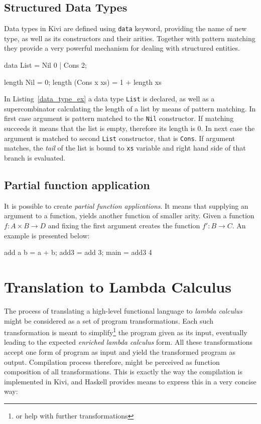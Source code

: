 \documentclass[12pt,a4paper]{report}
\begin{document}
\subsection{Structured Data Types}
Data types in Kivi are defined using \texttt{data} keyword, providing the name
of new type, as well as its constructors and their arities. Together with
pattern matching they provide a very powerful mechanism for dealing with
structured entities.

\vspace*{0.2in}
\begin{code}[style=haskell,label=data_type_ex,caption={Calculating length of list.}]
data List = Nil 0 | Cons 2;

length Nil = 0;
length (Cons x xs) = 1 + length xs
\end{code}

In Listing~\ref{data_type_ex} a data type \texttt{List} is declared, as well as
a supercombinator calculating the length of a list by means of pattern
matching. In first case argument is pattern matched to the \texttt{Nil}
constructor. If matching succeeds it means that the list is empty, therefore
its length is 0.  In next case the argument is matched to second \texttt{List}
constructor, that is \texttt{Cons}. If argument matches, the \textit{tail} of
the list is bound to \texttt{xs} variable and right hand side of that branch is
evaluated.

\subsection{Partial function application}
It is possible to create \textit{partial function applications}. It means that
supplying an argument to a function, yields another function of smaller arity.
Given a function $f : A \times B \rightarrow D$ and fixing the first argument
creates the function $f' : B \rightarrow C$. An example is presented below:

\vspace*{0.2in}
\begin{code}[style=haskell,caption={Partial application of addition.}]
add a b = a + b;
add3 = add 3;
main = add3 4
\end{code}

\section{Translation to Lambda Calculus}
The process of translating a high-level functional language to \textit{lambda
calculus} might be considered as a set of program transformations. Each such
transformation is meant to simplify\footnote{or help with further
transformations} the program given as its input, eventually leading to the
expected \textit{enriched lambda calculus} form. All these transformations
accept one form of program as input and yield the transformed program as
output. Compilation process therefore, might be perceived as function
composition of all transformations. This is exactly the way the compilation is
implemented in Kivi, and Haskell provides means to express this in a very
concise way:
\end{document}
